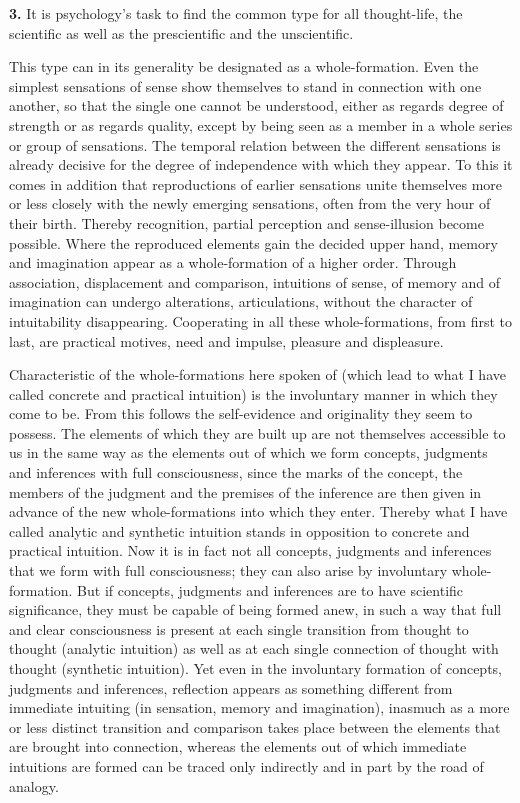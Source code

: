 \documentclass[12pt]{book}
\newcommand{\hnum}[1]{\textbf{#1.}\enspace}
\newcommand{\opage}[1]{\marginnote{\footnotesize\textit{[#1]}}}
\begin{document}
\hnum{3} It is psychology's task to find the common type for all thought-life,
the scientific as well as the prescientific and the unscientific.

This type can in its generality be designated as a whole-formation. Even the
simplest sensations of sense show themselves to stand in connection with one
another, so that the single one cannot be understood, either as regards degree
of strength or as regards quality, except by being seen as a member in a whole
series or group of sensations. The temporal relation between the different
sensations is already decisive for the degree of independence with which they
appear. To this it comes in addition that reproductions of earlier sensations
unite themselves more or less closely with the newly emerging sensations, often
from the very hour of their birth. Thereby recognition, partial perception and
sense-illusion become possible. Where the reproduced elements gain the decided
upper hand, memory and imagination appear as a whole-formation of a higher
order. Through association, displacement and comparison, intuitions of sense, of
memory and of imagination can undergo alterations, articulations, without the
character of intuitability disappearing. Cooperating in all these
whole-formations, from first to last, are practical motives, need and impulse,
pleasure and displeasure.

Characteristic of the whole-formations here spoken of (which lead to what I have
called concrete and practical intuition) is the involuntary manner in which they
come to be. From this follows the self-evidence and originality they seem to
possess. The elements of which they are built up are not themselves accessible
to us in the same way as the elements out of which we form concepts, judgments
and inferences with full consciousness, since the marks of the concept, the
members of the judgment and the premises of the inference are then given in
advance of the new whole-formations into which they enter. Thereby what I have
called analytic and synthetic intuition stands in opposition to concrete and
practical intuition. Now it is in fact not all concepts, judgments and
inferences that we form with full consciousness; they can also arise by
involuntary whole-formation. But if concepts, judgments and inferences are to
have scientific significance, they must be capable of being formed anew, in such
a way that full and clear consciousness is present \opage{7}at each single transition
from thought to thought (analytic intuition) as well as at each single
connection of thought with thought (synthetic intuition). Yet even in the
involuntary formation of concepts, judgments and inferences, reflection appears
as something different from immediate intuiting (in sensation, memory and
imagination), inasmuch as a more or less distinct transition and comparison
takes place between the elements that are brought into connection, whereas the
elements out of which immediate intuitions are formed can be traced only
indirectly and in part by the road of analogy.
\end{document}
